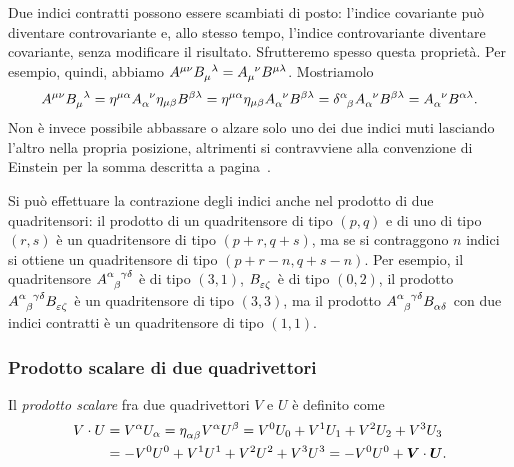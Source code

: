 Due indici contratti possono essere scambiati di posto: l'indice covariante può
diventare controvariante e, allo stesso tempo, l'indice controvariante diventare
covariante, senza modificare il risultato.  Sfrutteremo spesso questa proprietà.
Per esempio, quindi, abbiamo
$A^{\mu\nu}\tensor{B}{_{\mu}^{\lambda}} =
\tensor{A}{_{\mu}^{\nu}}B^{\mu\lambda}$.  Mostriamolo
\begin{equation}
  A^{\mu\nu}\tensor{B}{_{\mu}^{\lambda}} =
  \eta^{\mu\alpha}\tensor{A}{_{\alpha}^{\nu}} \eta_{\mu\beta}B^{\beta\lambda} =
  \eta^{\mu\alpha}\eta_{\mu\beta} \tensor{A}{_{\alpha}^{\nu}}B^{\beta\lambda} =
  \tensor{\delta}{^{\alpha}_{\beta}}\tensor{A}{_{\alpha}^{\nu}}B^{\beta\lambda}
  = \tensor{A}{_{\alpha}^{\nu}}B^{\alpha\lambda}.
\end{equation}
Non è invece possibile abbassare o alzare solo uno dei due indici muti lasciando
l'altro nella propria posizione, altrimenti si contravviene alla convenzione di
Einstein per la somma descritta a pagina~\pageref{cha:notazioni}.

Si può effettuare la contrazione degli indici anche nel prodotto di due
quadritensori: il prodotto di un quadritensore di tipo $(p,q)$ e di uno di tipo
$(r,s)$ è un quadritensore di tipo $(p+r,q+s)$, ma se si contraggono $n$ indici
si ottiene un quadritensore di tipo $(p+r-n,q+s-n)$.  Per esempio, il
quadritensore $\tensor{A}{^{\alpha}_{\beta}^{\gamma\delta}}$ è di tipo $(3,1)$,
$\tensor{B}{_{\epsilon\zeta}}$ è di tipo $(0,2)$, il prodotto
$\tensor{A}{^{\alpha}_{\beta}^{\gamma\delta}} \tensor{B}{_{\epsilon\zeta}}$ è un
quadritensore di tipo $(3,3)$, ma il prodotto
$\tensor{A}{^{\alpha}_{\beta}^{\gamma\delta}} \tensor{B}{_{\alpha\delta}}$ con
due indici contratti è un quadritensore di tipo $(1,1)$.

\subsubsection{Prodotto scalare di due quadrivettori}
\label{sec:prodotto-scalare-quadrivettori-minkowski}

Il \emph{prodotto scalare} fra due quadrivettori $V$ e $U$ è definito come
\begin{equation}
  \begin{split}
    V\cdot U &= V^{\alpha}U_{\alpha} =
    \tensor{\eta}{_{\alpha\beta}}V^{\alpha}U^{\beta} = V^{0}U_{0} + V^{1}U_{1} +
    V^{2}U_{2} + V^{3}U_{3} \\
    &= -V^{0}U^{0} + V^{1}U^{1} + V^{2}U^{2} + V^{3}U^{3} = -V^{0}U^{0} +
    \bm{V}\cdot\bm{U}.
  \end{split}
\end{equation}

